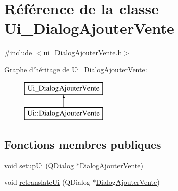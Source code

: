\hypertarget{class_ui___dialog_ajouter_vente}{\section{Référence de la classe Ui\-\_\-\-Dialog\-Ajouter\-Vente}
\label{class_ui___dialog_ajouter_vente}
}


{\ttfamily \#include $<$ui\-\_\-\-Dialog\-Ajouter\-Vente.\-h$>$}

Graphe d'héritage de Ui\-\_\-\-Dialog\-Ajouter\-Vente\-:\begin{figure}[H]
\begin{center}
\leavevmode
\includegraphics[height=2.000000cm]{class_ui___dialog_ajouter_vente}
\end{center}
\end{figure}
\subsection*{Fonctions membres publiques}
\begin{DoxyCompactItemize}
\item 
void \hyperlink{class_ui___dialog_ajouter_vente_ae883744c3e96eb7e48d7412542236d0b}{setup\-Ui} (Q\-Dialog $\ast$\hyperlink{class_dialog_ajouter_vente}{Dialog\-Ajouter\-Vente})
\item 
void \hyperlink{class_ui___dialog_ajouter_vente_ae2c336056d9da493f614411459dc933f}{retranslate\-Ui} (Q\-Dialog $\ast$\hyperlink{class_dialog_ajouter_vente}{Dialog\-Ajouter\-Vente})
\end{DoxyCompactItemize}
